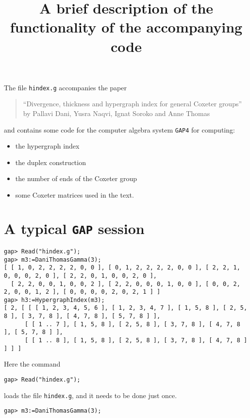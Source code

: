 \documentclass[10pt]{amsart}
\begin{document}
\title{A brief description of the functionality of the accompanying code}
\maketitle

\noindent
The file {\tt hindex.g} accompanies the paper
\begin{quote}
``Divergence, thickness and hypergraph index for general Coxeter groups'' by Pallavi Dani, Yusra Naqvi, Ignat Soroko and Anne Thomas
\end{quote}
and contains some code for the computer algebra system {\tt GAP4} for computing:
\begin{itemize}
\item the hypergraph index
\item the duplex construction
\item the number of ends of the Coxeter group
\item some Coxeter matrices used in the text.
\end{itemize}

\bigskip

\section{A typical {\tt GAP} session}

{\footnotesize
\begin{verbatim}
gap> Read("hindex.g");
gap> m3:=DaniThomasGamma(3);
[ [ 1, 0, 2, 2, 2, 2, 0, 0 ], [ 0, 1, 2, 2, 2, 2, 0, 0 ], [ 2, 2, 1, 0, 0, 0, 2, 0 ], [ 2, 2, 0, 1, 0, 0, 2, 0 ], 
  [ 2, 2, 0, 0, 1, 0, 0, 2 ], [ 2, 2, 0, 0, 0, 1, 0, 0 ], [ 0, 0, 2, 2, 0, 0, 1, 2 ], [ 0, 0, 0, 0, 2, 0, 2, 1 ] ]
gap> h3:=HypergraphIndex(m3);
[ 2, [ [ [ 1, 2, 3, 4, 5, 6 ], [ 1, 2, 3, 4, 7 ], [ 1, 5, 8 ], [ 2, 5, 8 ], [ 3, 7, 8 ], [ 4, 7, 8 ], [ 5, 7, 8 ] ], 
      [ [ 1 .. 7 ], [ 1, 5, 8 ], [ 2, 5, 8 ], [ 3, 7, 8 ], [ 4, 7, 8 ], [ 5, 7, 8 ] ], 
      [ [ 1 .. 8 ], [ 1, 5, 8 ], [ 2, 5, 8 ], [ 3, 7, 8 ], [ 4, 7, 8 ] ] ] ] 
\end{verbatim}
}

\bigskip\noindent
Here the command 
{\footnotesize
\begin{verbatim}
gap> Read("hindex.g");
\end{verbatim}}\noindent
loads the file {\tt hindex.g}, and it needs to be done just once.

\medskip\noindent
{\footnotesize
\begin{verbatim}
gap> m3:=DaniThomasGamma(3);
\end{verbatim}}
\end{document}
